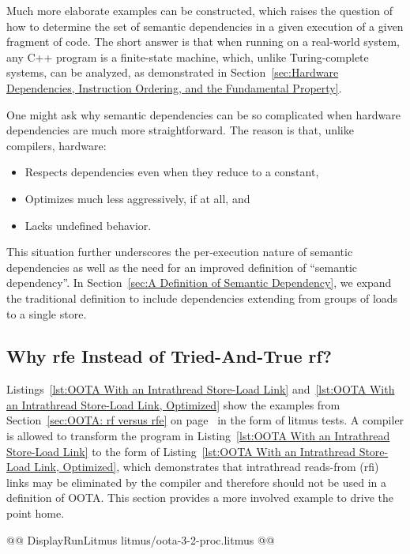 \documentclass[10]{article}
\begin{document}
Much more elaborate examples can be constructed,
which raises the question of how to determine the set of semantic
dependencies in a given execution of a given fragment of code.
The short answer is that when running on a real-world system, 
any C++ program is a finite-state machine, which, unlike Turing-complete
systems, can be analyzed, as demonstrated in
Section~\ref{sec:Hardware Dependencies, Instruction Ordering, and the Fundamental Property}.

One might ask why semantic dependencies can be so complicated when hardware
dependencies are much more straightforward.
The reason is that, unlike compilers, hardware:
\begin{itemize}
\item	Respects dependencies even when they reduce to a constant,
\item	Optimizes much less aggressively, if at all, and
\item	Lacks undefined behavior.
\end{itemize}
This situation further underscores the per-execution nature of semantic
dependencies as well as the need for an improved definition of ``semantic
dependency''.
In
Section~\ref{sec:A Definition of Semantic Dependency},
we expand the traditional definition to include dependencies extending
from groups of loads to a single store.

\subsection{Why rfe Instead of Tried-And-True rf?}
\label{app:Why rfe Instead of Tried-And-True rf?}

Listings~\ref{lst:OOTA With an Intrathread Store-Load Link}
and~\ref{lst:OOTA With an Intrathread Store-Load Link, Optimized}
show the examples from
Section~\ref{sec:OOTA: rf versus rfe}
on
page~\pageref{sec:OOTA: rf versus rfe}
in the form of litmus tests.
A compiler is allowed to transform the program in
Listing~\ref{lst:OOTA With an Intrathread Store-Load Link}
to the form of
Listing~\ref{lst:OOTA With an Intrathread Store-Load Link, Optimized},
which demonstrates that intrathread reads-from (rfi) links may be
eliminated by the compiler and therefore should not be used in a
definition of OOTA.
This section provides a more involved example to drive the point home.

\begin{listing}[tbp]
@@ DisplayRunLitmus litmus/oota-3-2-proc.litmus @@
\caption{OOTA With an Intrathread Store-Load Link}
\label{lst:OOTA With an Intrathread Store-Load Link}
\end{listing}
\end{document}
